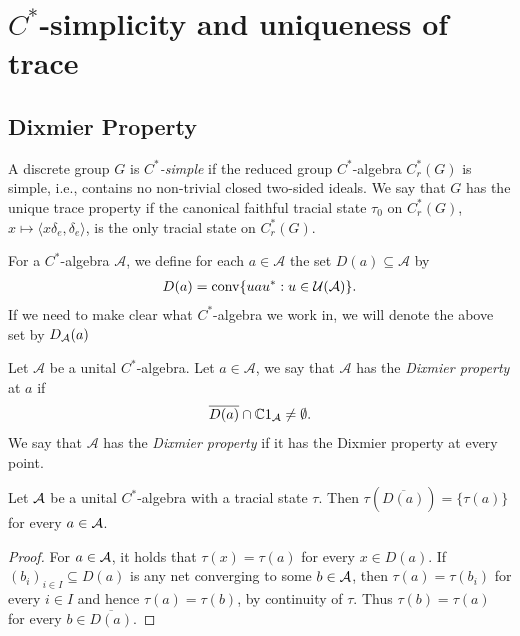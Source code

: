 \chapter{$C^*$-simplicity and uniqueness of trace}
\section{Dixmier Property}
\begin{definition}
A discrete group $G$ is \emph{$C^*$-simple} if the reduced group $C^*$-algebra $C^*_r(G)$ is simple, i.e., contains no non-trivial closed two-sided ideals. We say that $G$ has the unique trace property if the canonical faithful tracial state $\tau_0$ on $C^*_r(G)$, $x \mapsto \langle x \delta_e,\delta_e\rangle$, is the only tracial state on $C^*_r(G)$.
\end{definition}

\noindent For a  $C^*$-algebra $\mathcal{A}$, we define for each $a \in \mathcal{A}$ the set $D(a) \subseteq \mathcal{A}$ by
\begin{align*}
D(a)=\operatorname{conv}\{ uau^* : u \in \mathcal{U}(\mathcal{A})\}.
\end{align*}
If we need to make clear what $C^*$-algebra we work in, we will denote the above set by $D_{\mathcal{A}}(a)$

\begin{definition}\label{Dixmier}
Let $\mathcal{A}$ be a unital $C^*$-algebra. Let $a \in \mathcal{A}$, we say that $\mathcal{A}$ has the \emph{Dixmier property} at $a$ if
\begin{align*}
\overline{D(a)} \cap \mathbb{C} 1_{\mathcal{A}} \neq \emptyset.
\end{align*}
We say that $\mathcal{A}$ has the \emph{Dixmier property} if it has the Dixmier property at every point.
\end{definition}

\begin{lemma} \label{tau img}
Let $\mathcal{A}$ be a unital $C^*$-algebra with a tracial state $\tau$. Then $\tau\left(\overline{D(a)}\right)=\{\tau(a)\}$ for every $a \in \mathcal{A}$.
\begin{proof}
For $a \in \mathcal{A}$, it holds that $\tau(x)=\tau(a)$ for every $x \in D(a)$. If $(b_{i})_{i \in I} \subseteq D(a)$ is any net converging to some $b \in \mathcal{A}$, then $\tau(a)=\tau(b_{i})$ for every $i \in I$ and hence $\tau(a)=\tau(b)$, by continuity of $\tau$. Thus $\tau(b)=\tau(a)$ for every $b \in \overline{D(a)}$.
\end{proof}
\end{lemma}

